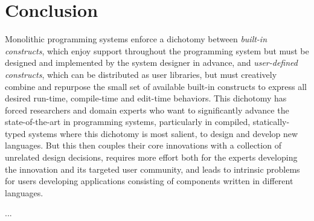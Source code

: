 \section{Conclusion}

Monolithic programming systems enforce a dichotomy between \emph{built-in constructs}, which enjoy support throughout the programming system but must be designed and implemented by the system designer in advance, and \emph{user-defined constructs}, which can be distributed as user libraries, but must creatively combine and repurpose the small set of available built-in constructs to express all desired run-time, compile-time and edit-time behaviors. This dichotomy has forced researchers and domain experts who want to significantly advance the state-of-the-art in programming systems, particularly in compiled, statically-typed systems where this dichotomy is most salient, to design and develop new languages. But this then couples their core innovations with a collection of unrelated design decisions, requires more effort both for the experts developing the innovation and its targeted user community, and leads to intrinsic problems for users developing applications consisting of components written in different languages.

...


\newpage
\listoftodos
\newpage